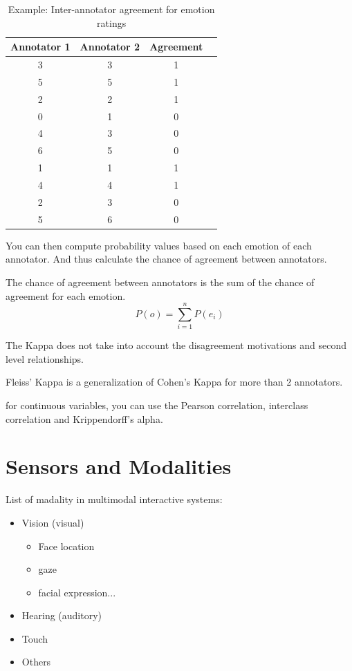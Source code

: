 \documentclass[11pt,a4paper]{article}
\theoremstyle{definition}
\theoremstyle{plain}
\theoremstyle{remark}
\begin{document}
\begin{table}[h]
\centering
\caption{Example: Inter-annotator agreement for emotion ratings }
\begin{tabular}{|c|c|c|c|}
\hline
\textbf{Annotator 1} & \textbf{Annotator 2} & \textbf{Agreement} \\
\hline
3 & 3 & 1 \\
5 & 5 & 1 \\
2 & 2 & 1 \\
0 & 1 & 0 \\
4 & 3 & 0 \\
6 & 5 & 0 \\
1 & 1 & 1 \\
4 & 4 & 1 \\
2 & 3 & 0 \\
5 & 6 & 0 \\
\hline
\end{tabular}
\end{table}

You can then compute probability values based on each emotion of each annotator.
And thus calculate the chance of agreement between annotators.

The chance of agreement between annotators is the sum of the chance of agreement for each emotion.
\[P(o) = \sum_{i=1}^{n} P(e_i)\]


The Kappa does not take into account the disagreement motivations and second level relationships.

Fleiss' Kappa is a generalization of Cohen's Kappa for more than 2 annotators.

for continuous variables, you can use the Pearson correlation, interclass correlation and
Krippendorff's alpha.

\section{Sensors and Modalities}
List of madality in multimodal interactive systems:
\begin{itemize}
    \item Vision (visual)
    \begin{itemize}
        \item Face location
        \item gaze
        \item facial expression...
    \end{itemize}
    \item Hearing (auditory)
    \item Touch
    \item Others
\end{itemize}
\end{document}
